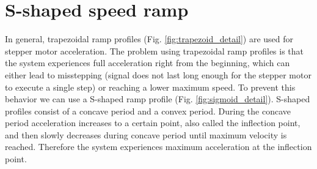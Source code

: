 \documentclass[hidelinks, 11pt, fleqn]{article}   	%
\begin{document}
\section{S-shaped speed ramp}
In general, trapezoidal ramp profiles (Fig. \ref{fig:trapezoid_detail}) are used for stepper motor acceleration. The problem using trapezoidal ramp profiles is that the system experiences full acceleration right from the beginning, which can either lead to misstepping (signal does not last long enough for the stepper motor to execute a single step) or reaching a lower maximum speed. To prevent this behavior we can use a S-shaped ramp profile (Fig. \ref{fig:sigmoid_detail}). S-shaped profiles consist of a concave period and a convex period. During the concave period acceleration increases to a certain point, also called the inflection point, and then slowly decreases during concave period until maximum velocity is reached. Therefore the system experiences maximum acceleration at the inflection point.
\newline
\newline
\end{document}
